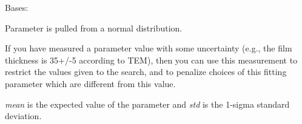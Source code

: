 \documentclass[letterpaper,10pt,english]{sphinxmanual}
\begin{document}
\begin{fulllineitems}
\label{api/mystic.bounds:refl1d.mystic.bounds.Normal}
Bases: {\hyperref[api/mystic.bounds:refl1d.mystic.bounds.Distribution]{}}

Parameter is pulled from a normal distribution.

If you have measured a parameter value with some uncertainty (e.g., the
film thickness is 35+/-5 according to TEM), then you can use this
measurement to restrict the values given to the search, and to penalize
choices of this fitting parameter which are different from this value.

\emph{mean} is the expected value of the parameter and \emph{std} is the 1-sigma
standard deviation.

\begin{fulllineitems}
\label{api/mystic.bounds:refl1d.mystic.bounds.Normal.get01}
\end{fulllineitems}


\begin{fulllineitems}
\label{api/mystic.bounds:refl1d.mystic.bounds.Normal.getfull}
\end{fulllineitems}


\begin{fulllineitems}
\label{api/mystic.bounds:refl1d.mystic.bounds.Normal.nllf}
\end{fulllineitems}


\begin{fulllineitems}
\label{api/mystic.bounds:refl1d.mystic.bounds.Normal.put01}
\end{fulllineitems}


\begin{fulllineitems}
\label{api/mystic.bounds:refl1d.mystic.bounds.Normal.putfull}
\end{fulllineitems}


\end{fulllineitems}
\end{document}
